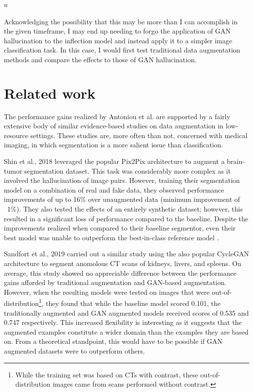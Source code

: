 ≈\documentclass{article}
\begin{document}
  Acknowledging the possibility that this may be more than I can accomplish in the given timeframe, I may end up needing to forgo the application of GAN hallucination to the inflection model and instead apply it to a simpler image classification task. In this case, I would first test traditional data augmentation methods and compare the effects to those of GAN hallucination.

  \section{Related work}
    The performance gains realized by Antoniou et al. \cite{antoniou} are supported by a fairly extensive body of similar evidence-based studies on data augmentation in low-resource settings. These studies are, more often than not, concerned with medical imaging, in which segmentation is a more salient issue than classification.
    
    Shin et al., 2018 \cite{shin} leveraged the popular Pix2Pix \cite{pix2pix} architecture to augment a brain-tumor segmentation dataset. This task was considerably more complex as it involved the hallucination of image pairs. However, training their segmentation model on a combination of real and fake data, they observed performance improvements of up to 16\% over unaugmented data (minimum improvement of ~1\%). They also tested the effects of an entirely synthetic dataset; however, this resulted in a significant loss of performance compared to the baseline. Despite the improvements realized when compared to their baseline segmentor, even their best model was unable to outperform the best-in-class reference model \cite{wang}.

    Sandfort et al., 2019 \cite{sandfort} carried out a similar study using the also popular CycleGAN architecture \cite{cyclegan} to segment anomolous CT scans of kidneys, livers, and spleens. On average, this study showed no appreciable difference between the performance gains afforded by traditional augmentation and GAN-based augmentation. However, when the resulting models were tested on images that were out-of-distribution\footnote{While the training set was based on CTs with contrast, these out-of-distribution images came from scans performed without contrast.}, they found that while the baseline model scored 0.101, the traditionally augmented and GAN augmented models received scores of 0.535 and 0.747 respectively. This increased flexibility is interesting as it suggests that the augmented examples constitute a wider domain than the examples they are based on. From a theoretical standpoint, this would have to be possible if GAN augmented datasets were to outperform others.
\end{document}
